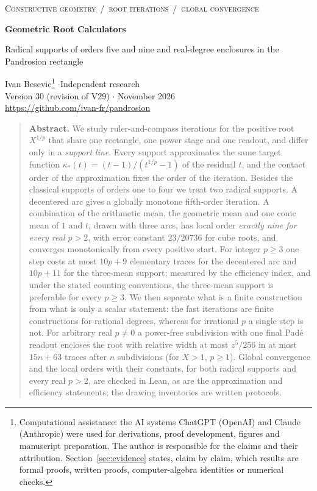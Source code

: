\documentclass[10pt,a4paper]{article}
\theoremstyle{plain}
\theoremstyle{remark}
\numberwithin{equation}{section}
\begin{document}
{\small\scshape Constructive geometry \,/\, root iterations \,/\, global convergence}

\vspace{6pt}
{\LARGE\bfseries Geometric Root Calculators\par}
\vspace{3pt}
{\large\raggedright Radical supports of orders five and nine and real-degree enclosures in the Pandrosion rectangle\par}
\vspace{8pt}
Ivan Besevic\footnote{Computational assistance: the AI systems ChatGPT (OpenAI) and Claude (Anthropic) were used for derivations, proof development,
figures and manuscript preparation. The author is responsible for the claims and their attribution.
Section~\ref{sec:evidence} states, claim by claim, which results are formal proofs, written proofs,
computer-algebra identities or numerical checks.}
\quad$\cdot$\quad Independent research\\
Version 30 (revision of V29) \quad$\cdot$ November 2026\\
\url{https://github.com/ivan-fr/pandrosion}

\vspace{6pt}
\begin{quote}\small
\textbf{Abstract.}
We study ruler-and-compass iterations for the positive root $X^{1/p}$ that share one rectangle, one
power stage and one readout, and differ only in a \emph{support line}. Every support approximates the
same target function $\kappa_*(t)=(t-1)/(t^{1/p}-1)$ of the residual $t$, and the contact order of the
approximation fixes the order of the iteration. Besides the classical supports of orders one to four we
treat two radical supports. A decentered arc gives a globally monotone fifth-order iteration. A
combination of the arithmetic mean, the geometric mean and one conic mean of $1$ and $t$, drawn with three
arcs, has local order \emph{exactly nine for every real $p>2$}, with error constant $23/20736$ for cube
roots, and converges monotonically from every positive start. For integer $p\ge 3$ one step costs at
most $10p+9$ elementary traces for the decentered arc and $10p+11$ for the three-mean support; measured
by the efficiency index, and under the stated counting conventions, the three-mean support is preferable
for every $p\ge3$. We then separate what is a finite construction from what is only a scalar statement:
the fast iterations are finite constructions for rational degrees, whereas for irrational $p$ a single
step is not. For arbitrary real $p\neq 0$ a power-free subdivision with one final Pad\'e readout encloses
the root with relative width at most $z^5/256$ in at most $15n+63$ traces after $n$ subdivisions (for
$X>1$, $p\ge 1$). Global convergence and the local orders with their constants, for both radical
supports and every real $p>2$, are checked in Lean, as are the approximation and efficiency statements;
the drawing inventories are written protocols.
\end{quote}
\end{document}
